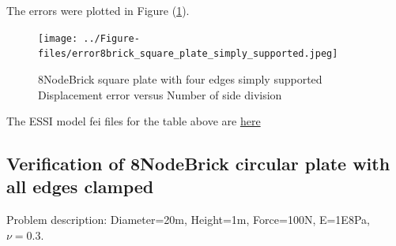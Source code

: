 \documentclass[fleqn,11pt]{article}
\begin{document}

The errors were plotted in Figure (\ref{fig 8NodeBrick square plate with four edge simply supported}).
\begin{figure}[H]
    \centering
    \texttt{[image: ../Figure-files/error8brick\_square\_plate\_simply\_supported.jpeg]}
  \captionsetup{justification=centering,margin=3cm}
  \caption{8NodeBrick square plate with four edges simply supported\\
      Displacement error   versus   Number of side division}
  \label{fig 8NodeBrick square plate with four edge simply supported}
\end{figure}


The ESSI model fei files for the table above are \href{https://github.com/yuan-energy/ESSI_Verification/blob/master/8NodeBrick/square_plate_simply_support/square_plate_simply_support.tar.gz?raw=true}{here}

























\newpage
\subsection{Verification of 8NodeBrick circular plate with all edges clamped}

Problem description: Diameter=20m, Height=1m, Force=100N, E=1E8Pa, $\nu=0.3$. 
\end{document}
